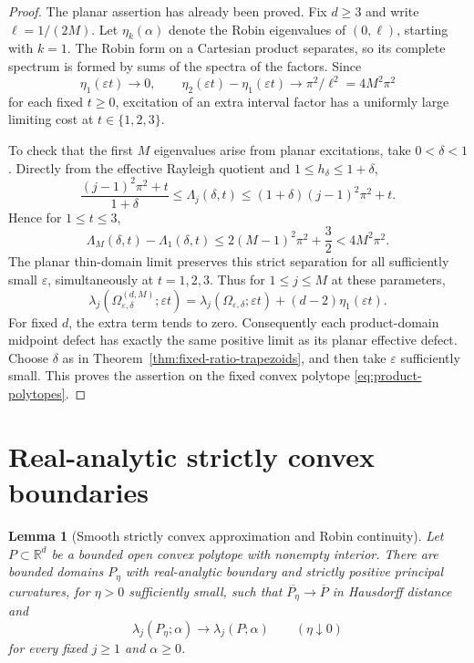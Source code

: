 \documentclass[11pt,a4paper]{article}
\newtheorem{lemma}[theorem]{Lemma}
\theoremstyle{definition}\newtheorem{definition}[theorem]{Definition}
\theoremstyle{remark}\newtheorem{remark}[theorem]{Remark}
\begin{document}
\begin{proof}
The planar assertion has already been proved. Fix $d\geq3$ and
write $\ell=1/(2M)$. Let $\eta_k(\alpha)$ denote the Robin
eigenvalues of $(0,\ell)$, starting with $k=1$. The Robin form
on a Cartesian product separates, so its complete spectrum is
formed by sums of the spectra of the factors. Since
\[
 \eta_1(\varepsilon t)\to0,\qquad
 \eta_2(\varepsilon t)-\eta_1(\varepsilon t)
                  \to\pi^2/\ell^2=4M^2\pi^2
\]
for each fixed $t\geq0$, excitation of an extra interval factor
has a uniformly large limiting cost at $t\in\{1,2,3\}$.

To check that the first $M$ eigenvalues arise from planar
excitations, take $0<\delta<1$. Directly from the effective
Rayleigh quotient and $1\leq h_\delta\leq1+\delta$,
\[
 \frac{(j-1)^2\pi^2+t}{1+\delta}
 \leq\Lambda_j(\delta,t)
 \leq(1+\delta)(j-1)^2\pi^2+t.
\]
Hence for $1\leq t\leq3$,
\[
 \Lambda_M(\delta,t)-\Lambda_1(\delta,t)
 \leq2(M-1)^2\pi^2+\frac32
 <4M^2\pi^2.
\]
The planar thin-domain limit preserves this strict separation
for all sufficiently small $\varepsilon$, simultaneously at
$t=1,2,3$. Thus for $1\leq j\leq M$ at these parameters,
\[
 \lambda_j(\Omega_{\varepsilon,\delta}^{(d,M)};
                    \varepsilon t)
 =\lambda_j(\Omega_{\varepsilon,\delta};\varepsilon t)
                  +(d-2)\eta_1(\varepsilon t).
\]
For fixed $d$, the extra term tends to zero. Consequently each
product-domain midpoint defect has exactly the same positive
limit as its planar effective defect. Choose $\delta$ as in
Theorem~\ref{thm:fixed-ratio-trapezoids}, and then take
$\varepsilon$ sufficiently small. This proves the assertion
on the fixed convex polytope \eqref{eq:product-polytopes}.
\end{proof}

\section{Real-analytic strictly convex boundaries}
\begin{lemma}[Smooth strictly convex approximation and Robin continuity]
\label{lem:smooth-robin-independent}
Let $P\subset\mathbb R^d$ be a bounded open convex polytope with
nonempty interior. There are bounded domains $P_\eta$ with real-analytic boundary and
strictly positive principal curvatures, for $\eta>0$ sufficiently small,
such that $\overline{P_\eta}\to\overline P$ in Hausdorff distance and
\[
 \lambda_j(P_\eta;\alpha)\longrightarrow\lambda_j(P;\alpha)
 \qquad(\eta\downarrow0)
\]
for every fixed $j\geq1$ and $\alpha\geq0$.
\end{lemma}
\end{document}
